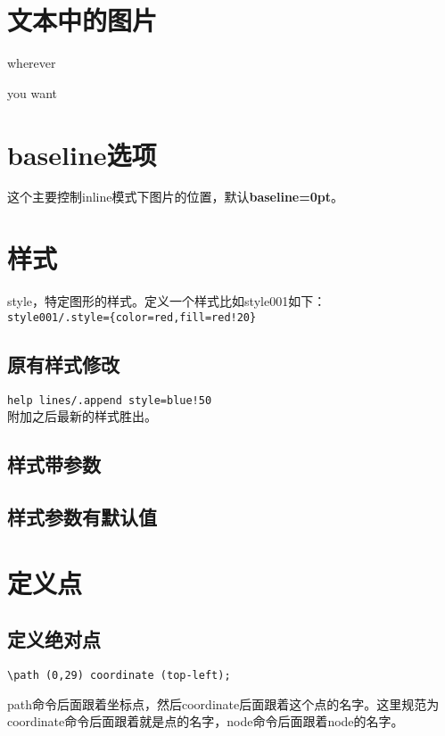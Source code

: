\documentclass[11pt,oneside]{book}
\begin{document}
\begin{common-format}
\section{文本中的图片}
wherever  you want



\section{baseline选项}
这个主要控制inline模式下图片的位置，默认\textbf{baseline=0pt}。

\section{样式}
style，特定图形的样式。定义一个样式比如style001如下：\\
\verb+style001/.style={color=red,fill=red!20}+

\subsection{原有样式修改}
\verb+help lines/.append style=blue!50+\\
附加之后最新的样式胜出。

\subsection{样式带参数}

\subsection{样式参数有默认值}

\section{定义点}
\subsection{定义绝对点}
\begin{Verbatim}
\path (0,29) coordinate (top-left);
\end{Verbatim}
path命令后面跟着坐标点，然后coordinate后面跟着这个点的名字。这里规范为coordinate命令后面跟着就是点的名字，node命令后面跟着node的名字。


\end{common-format}
\end{document}
